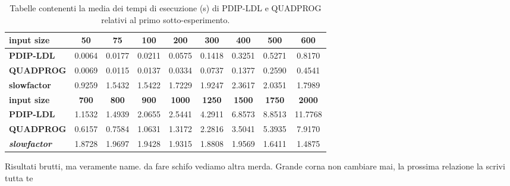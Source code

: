 \begin{table}[!h]
\centering
\begin{tabular}{|l|c|c|c|c|c|c|c|c|}
\hline \textbf{input size}                  & \textbf{50}  & \textbf{75}  & \textbf{100} & \textbf{200}  & \textbf{300}  & \textbf{400}  & \textbf{500}  & \textbf{600}  \\\hline
\textbf{PDIP-LDL}                    & 0.0064       & 0.0177       & 0.0211       & 0.0575        & 0.1418        & 0.3251        & 0.5271        & 0.8170        \\
\textbf{QUADPROG}                    & 0.0069       & 0.0115       & 0.0137       & 0.0334        & 0.0737        & 0.1377        & 0.2590        & 0.4541        \\
\textbf{slowfactor} & 0.9259       & 1.5432       & 1.5422       & 1.7229        & 1.9247        & 2.3617        & 2.0351        & 1.7989        \\ \hline
\textbf{input size}                  & \textbf{700} & \textbf{800} & \textbf{900} & \textbf{1000} & \textbf{1250} & \textbf{1500} & \textbf{1750} & \textbf{2000} \\\hline
\textbf{PDIP-LDL}                    & 1.1532       & 1.4939       & 2.0655       & 2.5441        & 4.2911        & 6.8573        & 8.8513        & 11.7768       \\
\textbf{QUADPROG}                    & 0.6157       & 0.7584       & 1.0631       & 1.3172        & 2.2816        & 3.5041        & 5.3935        & 7.9170        \\
\textbf{\textit{slowfactor}} & 1.8728       & 1.9697       & 1.9428       & 1.9315        & 1.8808        & 1.9569        & 1.6411        & 1.4875  \\\hline     
\end{tabular}
    \caption{Tabelle contenenti la media dei tempi di esecuzione (s) di PDIP-LDL e QUADPROG relativi al primo sotto-esperimento. \label{tab:ldlqp2}}
    \end{table}
   
 Risultati brutti, ma veramente name. da fare schifo vediamo altra merda. Grande corna non cambiare mai, la prossima relazione la scrivi tutta te
    
